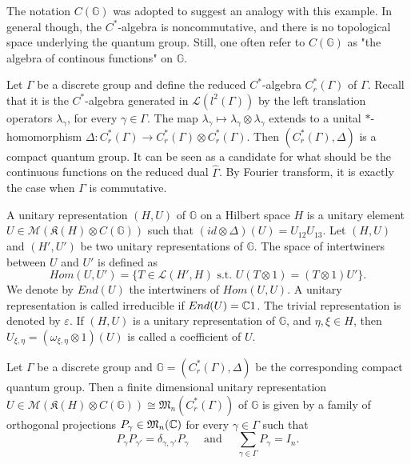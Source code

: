 The notation $C(\mathbb G)$ was adopted to suggest an analogy with this example. In general though, the $C^*$-algebra is noncommutative, and there is no topological space underlying the quantum group. Still, one often refer to $C(\mathbb G)$ as "the algebra of continous functions" on $\mathbb G$.

\begin{Expl}
Let $\Gamma$ be a discrete group and define the reduced $C^*$-algebra $C_r^*(\Gamma)$ of $\Gamma$. Recall that it is the $C^*$-algebra generated in $\mathcal L(l^2(\Gamma))$ by the left translation operators $\lambda_\gamma$, for every $\gamma\in\Gamma$. The map $ \lambda_\gamma \mapsto \lambda_\gamma\otimes \lambda_\gamma$ extends to a unital $*$-homomorphism $\Delta :C_r^*(\Gamma)\rightarrow C_r^*(\Gamma)\otimes C_r^*(\Gamma) $. Then $(C_r^*(\Gamma),\Delta)$ is a compact quantum group. It can be seen as a candidate for what should be the continuous functions on the reduced dual $\hat\Gamma$. By Fourier transform, it is exactly the case when $\Gamma$ is commutative.
\end{Expl}

\begin{definition} A unitary representation $(H,U)$ of $\mathbb G$ on a Hilbert space $H$ is a unitary element $U \in \mathcal M(\mathfrak K(H)\otimes C(\mathbb G))$ such that $(id\otimes\Delta)(U) = U_{12}U_{13}$. Let $(H,U)$ and $(H',U')$ be two unitary representations of $\mathbb G$. The space of intertwiners between $U$ and $U'$ is defined as 
\[Hom(U,U') = \{T\in \mathcal L(H',H) \text{ s.t. }U(T\otimes 1) = (T\otimes 1) U' \}.\]
We denote by $End(U)$ the intertwiners of $Hom(U,U)$. A unitary representation is called irreducible if $End(U) = \mathbb C 1$. The trivial representation is denoted by $\varepsilon$. If $(H,U)$ is a unitary representation of $\mathbb G$, and $\eta,\xi\in H$, then $U_{\xi,\eta} = (\omega_{\xi,\eta}\otimes 1)( U )$ is called a coefficient of $U$.
\end{definition}

\begin{Expl} Let $\Gamma$ be a discrete group and $\mathbb G = (C_r^*(\Gamma),\Delta)$ be the corresponding compact quantum group. Then a finite dimensional unitary representation $U\in \mathcal M(\mathfrak K(H)\otimes C(\mathbb G))\cong\mathfrak M_n(C^*_r(\Gamma))$ of $\mathbb G$ is given by a family of orthogonal projections $P_\gamma\in \mathfrak M_n(\mathbb C)$ for every $\gamma\in \Gamma$ such that 
\[P_{\gamma}P_{\gamma'} = \delta_{\gamma,\gamma'} P_{\gamma}\quad\text{ and }\quad \sum_{\gamma\in\Gamma} P_{\gamma} = I_n.\]
\end{Expl}

